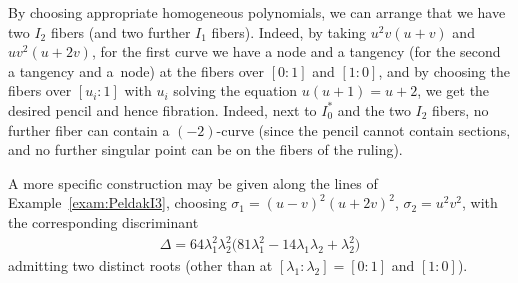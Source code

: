 \documentclass[10pt,a4paper]{amsart}
\numberwithin{equation}{section}
\begin{document}
\begin{Example} By choosing appropriate homogeneous polynomials, we can arrange that we have two $I_2$ fibers (and two further $I_1$ fibers). Indeed, by taking $u^2v(u+v)$ and $uv^2(u+2v)$, for the first curve we have a node and a tangency (for the second a tangency and a~node) at the fibers over $[0:1]$ and $[1:0]$, and by choosing the fibers over $[u_i:1]$ with $u_i$ solving the equation $u(u+1)=u+2$, we get the desired pencil and hence fibration. Indeed, next to $I_0^*$ and the two $I_2$ fibers, no further fiber can contain a $(-2)$-curve (since the pencil cannot contain sections, and no further singular point can be on the fibers of the ruling).

A more specific construction may be given along the lines of Example~\ref{exam:PeldakI3},
choosing $\sigma_1 = (u-v)^2 (u+2v)^2$, $\sigma_2 = u^2v^2$, with the corresponding discriminant
\begin{gather*}
 \Delta = 64 \lambda_1^2 \lambda_2^2 \big(81 \lambda_1^2 -14 \lambda_1 \lambda_2 + \lambda_2^2\big)
\end{gather*}
admitting two distinct roots (other than at $[\lambda_1 : \lambda_2] = [0:1]$ and $[1:0]$).
\end{Example}
\end{document}
